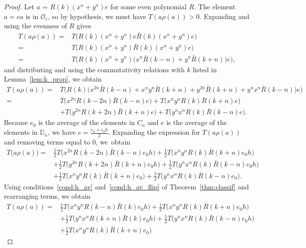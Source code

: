 \documentclass[pdftex]{sigma}
\newcommand\DD{\mathbb{D}}
\newcommand\cO{\mathcal{O}}
\newcommand\R{\bar{R}}
\newcommand\thalf{\ensuremath{\tfrac12}}
\numberwithin{equation}{section}
\theoremstyle{definition}
\begin{document}
\begin{proof}
 Let $a$ = $R(k) (x^n + y^n) e$
 for some even polynomial $R$.
 The element $a = ea$ is in $\cO_c$, so by hypothesis,
 we must have $T(a \rho(a)) > 0$.
 Expanding and using the evenness of $R$ gives
 \begin{align*}
 T(a \rho(a)) ={}& T\bigl( R(k) (x^n + y^n) e
 \R(k) (x^n + y^n) e \bigr) \\
 ={}& T\bigl( R(k) (x^n + y^n)
 \R(k) (x^n + y^n) e \bigr) \\
 ={}& T\bigl( R(k) (x^n + y^n)
 \bigl( x^n \R(k - n) + y^n \R(k + n) \bigr)
 e \bigr),
 \end{align*}
 and distributing and using the commutativity relations
 with $k$ listed in Lemma~\ref{lem:k_prop},
 we obtain
 \begin{align*}
 T(a \rho(a))
 ={}& T\bigl( R(k) \bigl( x^{2n} \R(k - n) + x^n y^n \R(k + n)
 + y^{2n} \R(k + n) + y^n x^n \R(k - n) \bigr)
 e \bigr) \\
 ={}& T\bigl( x^{2n} R(k - 2n) \R(k - n) e \bigr)
 + T\bigl( x^n y^n R(k) \R(k + n) e \bigr) \\
 & + T\bigl( y^{2n} R(k + 2n) \R(k + n) e \bigr)
 + T\bigl( y^n x^n R(k) \R(k - n) e \bigr).
 \end{align*}
 Because $e_0$ is the average of the elements in $C_n$
 and $e$ is the average of the elements in $\DD_n$,
 we have $e = \frac{e_0 + e_0 h}{2}$.
 Expanding the expression for $T(a \rho(a))$
 and removing terms equal to $0$,
 we~obtain
 \begin{align*}
 T\bigl( a \rho(a) \bigr)
 ={}& \thalf T\bigl( x^{2n} R(k - 2n) \R(k - n) e_0 h \bigr)
 + \thalf T\bigl( x^n y^n R(k) \R(k + n) e_0 h \bigr) \\
 & + \thalf T\bigl( y^{2n} R(k + 2n) \R(k + n) e_0 h
 \bigr)
 + \thalf T\bigl( y^n x^n R(k) \R(k - n) e_0 h \bigr) \\
 & + \thalf T\bigl( x^n y^n R(k) \R(k + n) e_0
 \bigr)
 + \thalf T \bigl( y^n x^n R(k) \R(k - n) e_0 \bigr).
 \end{align*}
 Using conditions~\ref{cond:h_av} and~\ref{cond:h_av_flip}
 of Theorem~\ref{thm:classif}
 and rearranging terms, we obtain
 \begin{align*}
 T( a \rho(a) ) ={}& \thalf T\bigl( x^n y^n R(k - n) \R(k) e_0 h \bigr)
 + \thalf T\bigl( x^n y^n R(k) \R(k + n) e_0 h \bigr) \\
 & + \thalf T\bigl( y^n x^n R(k + n) \R(k) e_0 h \bigr)
 + \thalf T\bigl( y^n x^n R(k) \R(k - n) e_0 h \bigr) \\
 & + \thalf T\bigl( x^n y^n R(k) \R(k + n) e_0 \bigr)

\end{align*}
\end{proof}
\end{document}
